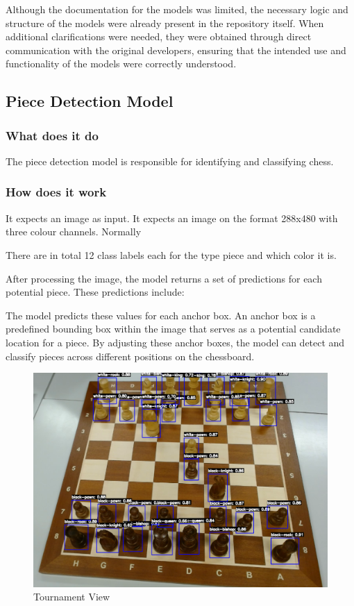 Although the documentation for the models was limited, the necessary logic and structure of the models were already present in the repository itself. When additional clarifications were needed, they were obtained through direct communication with the original developers, ensuring that the intended use and functionality of the models were correctly understood. 



\subsection{Piece Detection Model}

\subsubsection{What does it do}
The piece detection model is responsible for identifying and classifying chess. 

\subsubsection{How does it work}
It expects an image as input. It expects an image on the format 288x480 with three colour channels. Normally

There are in total 12 class labels each for the type piece and which color it is.

After processing the image, the model returns a set of predictions for each potential piece. These predictions include:

The model predicts these values for each anchor box. An anchor box is a predefined bounding box within the image that serves as a potential candidate location for a piece. By adjusting these anchor boxes, the model can detect and classify pieces across different positions on the chessboard.


\begin{subfigure}[h!]{0.9\linewidth} \centering \includegraphics[width=\linewidth]{figures/methods/ml-models/piece-model.png} \caption{Tournament View} \end{subfigure}
